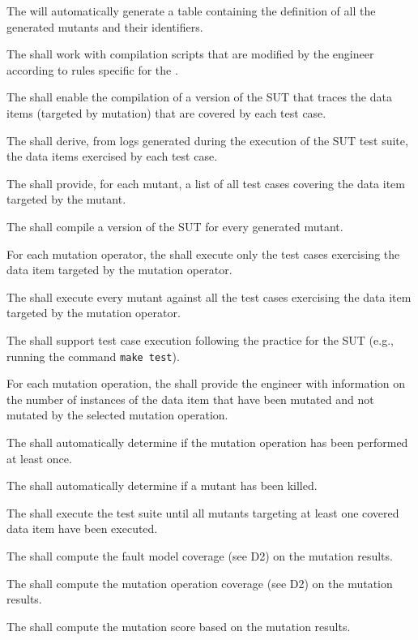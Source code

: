 \RQ{} The \FAQAS will automatically generate a table containing the definition of all the generated mutants and their identifiers.

\RQ{} The \FAQAS shall work with compilation scripts that are modified by the engineer according to rules specific for the \FAQAS.

\RQ{} The \FAQAS shall enable the compilation of a version of the SUT that traces the data items (targeted by mutation) that are covered by each test case.

\RQ{} The \FAQAS shall derive, from logs generated during the execution of the SUT test suite, the data items exercised by each test case.

\RQ{} The \FAQAS shall provide, for each mutant, a list of all test cases covering the data item targeted by the mutant.

\RQ{} The \FAQAS shall compile a version of the SUT for every generated mutant.

\RQ{} For each mutation operator, the \FAQAS shall execute only the test cases exercising the data item targeted by the mutation operator.

\RQ{} The \FAQAS shall execute every mutant against all the test cases exercising the data item targeted by the mutation operator.

\RQ{} The \FAQAS shall support test case execution following the practice for the SUT (e.g., running the command \texttt{make test}).

\RQ{} For each mutation operation, the \FAQAS shall provide the engineer with information on the number of instances of the data item that have been mutated and not mutated by the selected mutation operation.

\RQ{} The \FAQAS shall automatically determine if the mutation operation has been performed at least once.

\RQ{} The \FAQAS shall automatically determine if a mutant has been killed.

\RQ{} The \FAQAS shall execute the test suite until all mutants targeting at least one covered data item have been executed.

\RQ{} The \FAQAS shall compute the fault model coverage (see D2) on the mutation results.

\RQ{} The \FAQAS shall compute the mutation operation coverage (see D2) on the mutation results.

\RQ{} The \FAQAS shall compute the mutation score based on the mutation results.

